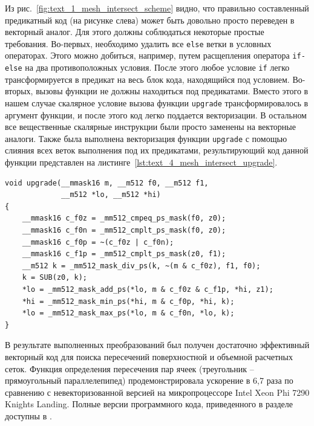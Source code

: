 Из рис.~\ref{fig:text_1_mesh_intersect_scheme} видно, что правильно составленный предикатный код (на рисунке слева) может быть довольно просто переведен в векторный аналог.
Для этого должны соблюдаться некоторые простые требования.
Во-первых, необходимо удалить все \texttt{else} ветки в условных операторах.
Этого можно добиться, например, путем расщепления оператора \texttt{if-else} на два противоположных условия.
После этого любое условие \texttt{if} легко трансформируется в предикат на весь блок кода, находящийся под условием.
Во-вторых, вызовы функции не должны находиться под предикатами.
Вместо этого в нашем случае скалярное условие вызова функции \texttt{upgrade} трансформировалось в аргумент функции, и после этого код легко поддается векторизации.
В остальном все вещественные скалярные инструкции были просто заменены на векторные аналоги.
Также была выполнена векторизация функции \texttt{upgrade} с помощью слияния всех веток выполнения под их предикатами, результирующий код данной функции представлен на листинге~\ref{lst:text_4_mesh_intersect_upgrade}.

\begin{lstlisting}[caption={Векторная реализация функции upgrade с пропагированным условием вызова внутрь функции.},label={lst:text_4_mesh_intersect_upgrade}]
void upgrade(__mmask16 m, __m512 f0, __m512 f1,
             __m512 *lo, __m512 *hi)
{
    __mmask16 c_f0z = _mm512_cmpeq_ps_mask(f0, z0);
    __mmask16 c_f0n = _mm512_cmplt_ps_mask(f0, z0);
    __mmask16 c_f0p = ~(c_f0z | c_f0n);
    __mmask16 c_f1p = _mm512_cmplt_ps_mask(z0, f1);
    __m512 k = _mm512_mask_div_ps(k, ~(m & c_f0z), f1, f0);
    k = SUB(z0, k);
    *lo = _mm512_mask_add_ps(*lo, m & c_f0z & c_f1p, *hi, z1);
    *hi = _mm512_mask_min_ps(*hi, m & c_f0p, *hi, k);
    *lo = _mm512_mask_max_ps(*lo, m & c_f0n, *lo, k);
}
\end{lstlisting}

В результате выполненных преобразований был получен достаточно эффективный векторный код для поиска пересечений поверхностной и объемной расчетных сеток.
Функция определения пересечения пар ячеек (треугольник -- прямоугольный параллелепипед) продемонстрировала ускорение в 6,7 раза по сравнению с невекторизованной версией на микропроцессоре Intel Xeon Phi 7290 Knights Landing.
Полные версии программного кода, приведенного в разделе доступны в \cite{iparGithub}.
